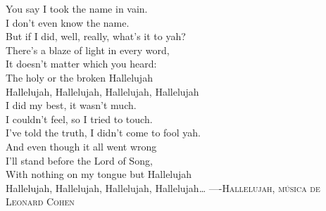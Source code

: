 \begin{titlepage}
\begin{fullwidth}
\begin{epigraphs}
{You say I took the name in vain.\\
I don't even know the name.\\
But if I did, well, really, what's it to yah?\\
There's a blaze of light in every word,\\
It doesn't matter which you heard:\\
The holy or the broken Hallelujah\\[1.5ex]
Hallelujah, Hallelujah, Hallelujah, Hallelujah\\[1.5ex]
I did my best, it wasn't much.\\
I couldn't feel, so I tried to touch.\\
I've told the truth, I didn't come to fool yah.\\
And even though it all went wrong\\
I'll stand before the Lord of Song,\\
With nothing on my tongue but Hallelujah\\[1.5ex]
Hallelujah, Hallelujah, Hallelujah, Hallelujah\ldots}
{----\textsc{Hallelujah, música de Leonard Cohen}}

\end{epigraphs}
\end{fullwidth}
\end{titlepage}
